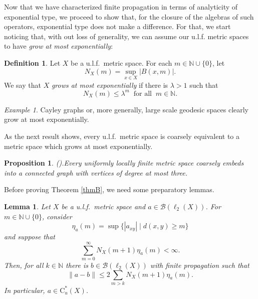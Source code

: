 \documentclass[11pt]{amsart}
\newcommand{\N}{\mathbb{N}}
\newcommand{\B}{\mathcal{B}}
\newcommand{\cB}{\mathcal{B}}
\newcommand{\cstu}{\mathrm{C}^*_u}
\numberwithin{equation}{section}
\newtheorem{proposition}[theorem]{Proposition}
\newtheorem{lemma}[theorem]{Lemma}
\theoremstyle{definition}
\newtheorem{definition}[theorem]{Definition}
\theoremstyle{remark}
\newtheorem{example}[theorem]{Example}
\begin{document}
Now that we have characterized finite propagation in terms of analyticity of exponential type, we proceed to show that, for the closure of the algebras of such operators, exponential type does not make a difference. For that, we start noticing that, with out loss of generality, we can assume our u.l.f. metric spaces to have \emph{grow at most exponentially}: 

\begin{definition}\label{Defi.Exp.Growth}
    Let $X$ be a u.l.f.\ metric space. For each $m\in\N\cup\{0\}$, let 
    \[N_X(m)=\sup_{x\in X}|B(x,m)|.\]
    We say that $X$ \emph{grows at most exponentially} if there is $\lambda>1$ such that \[N_X(m)\leq \lambda^m\ \text{ for all }\  m\in\N.\]
\end{definition}


\begin{example}\label{Defi.21.sep.26.1.qqq}
Cayley graphs or, more generally, large scale geodesic spaces clearly grow at most exponentially.  
\end{example}

As the next result shows, every u.l.f.\ metric space is coarsely equivalent to a metric space which grows at most exponentially.

\begin{proposition}\emph{(}\cite[Proposition 5.1]{DranishnikovGongLafforgueYu2002CanMathJ}{)}.Every uniformly locally finite metric space coarsely embeds into
a connected graph with vertices of degree at most three.\label{DranishnikovGongLafforgueYu2002CanMathJ.11}
\end{proposition}


Before proving Theorem \ref{thmB}, we need some preparatory lemmas.

\begin{lemma}\label{lem:volume}
Let $X$ be a u.l.f.\ metric space and $a\in\B(\ell_2(X))$. For $m\in\N\cup\{0\}$, consider \[\eta_a(m)=\sup\{|a_{xy}|\mid d(x,y)\ge m\}
\]
and suppose that  \begin{equation}\label{Eq.Sum.Convam.eta}\sum_{m=0}^\infty N_X(m+1)\eta_a(m)<\infty.
\end{equation} Then, for all   $k\in\N$ there is $b\in \cB(\ell_2(X))$ with finite propagation   such that \[\|a-b\|\le2\sum_{m>k}N_X(m+1)\eta_a(m).\]
In particular, $a\in \cstu(X)$.
\end{lemma}
\end{document}
